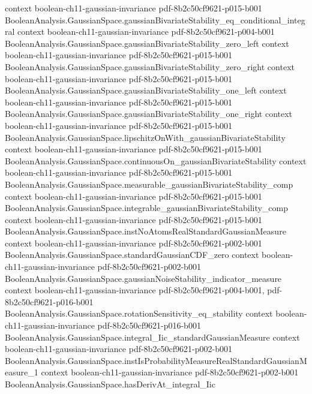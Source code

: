 \begin{theorem}
  {context}
  {boolean-ch11-gaussian-invariance}
  {pdf-8b2c50cf9621-p015-b001}
\proofstep
  {BooleanAnalysis.GaussianSpace.gaussianBivariateStability_eq_conditional_integral}
  {context}
  {boolean-ch11-gaussian-invariance}
  {pdf-8b2c50cf9621-p004-b001}
\proofstep
  {BooleanAnalysis.GaussianSpace.gaussianBivariateStability_zero_left}
  {context}
  {boolean-ch11-gaussian-invariance}
  {pdf-8b2c50cf9621-p015-b001}
\proofstep
  {BooleanAnalysis.GaussianSpace.gaussianBivariateStability_zero_right}
  {context}
  {boolean-ch11-gaussian-invariance}
  {pdf-8b2c50cf9621-p015-b001}
\proofstep
  {BooleanAnalysis.GaussianSpace.gaussianBivariateStability_one_left}
  {context}
  {boolean-ch11-gaussian-invariance}
  {pdf-8b2c50cf9621-p015-b001}
\proofstep
  {BooleanAnalysis.GaussianSpace.gaussianBivariateStability_one_right}
  {context}
  {boolean-ch11-gaussian-invariance}
  {pdf-8b2c50cf9621-p015-b001}
\proofstep
  {BooleanAnalysis.GaussianSpace.lipschitzOnWith_gaussianBivariateStability}
  {context}
  {boolean-ch11-gaussian-invariance}
  {pdf-8b2c50cf9621-p015-b001}
\proofstep
  {BooleanAnalysis.GaussianSpace.continuousOn_gaussianBivariateStability}
  {context}
  {boolean-ch11-gaussian-invariance}
  {pdf-8b2c50cf9621-p015-b001}
\proofstep
  {BooleanAnalysis.GaussianSpace.measurable_gaussianBivariateStability_comp}
  {context}
  {boolean-ch11-gaussian-invariance}
  {pdf-8b2c50cf9621-p015-b001}
\proofstep
  {BooleanAnalysis.GaussianSpace.integrable_gaussianBivariateStability_comp}
  {context}
  {boolean-ch11-gaussian-invariance}
  {pdf-8b2c50cf9621-p015-b001}
\proofstep
  {BooleanAnalysis.GaussianSpace.instNoAtomsRealStandardGaussianMeasure}
  {context}
  {boolean-ch11-gaussian-invariance}
  {pdf-8b2c50cf9621-p002-b001}
\proofstep
  {BooleanAnalysis.GaussianSpace.standardGaussianCDF_zero}
  {context}
  {boolean-ch11-gaussian-invariance}
  {pdf-8b2c50cf9621-p002-b001}
\proofstep
  {BooleanAnalysis.GaussianSpace.gaussianNoiseStability_indicator_measure}
  {context}
  {boolean-ch11-gaussian-invariance}
  {pdf-8b2c50cf9621-p004-b001,
    pdf-8b2c50cf9621-p016-b001}
\proofstep
  {BooleanAnalysis.GaussianSpace.rotationSensitivity_eq_stability}
  {context}
  {boolean-ch11-gaussian-invariance}
  {pdf-8b2c50cf9621-p016-b001}
\proofstep
  {BooleanAnalysis.GaussianSpace.integral_Iic_standardGaussianMeasure}
  {context}
  {boolean-ch11-gaussian-invariance}
  {pdf-8b2c50cf9621-p002-b001}
\proofstep
  {BooleanAnalysis.GaussianSpace.instIsProbabilityMeasureRealStandardGaussianMeasure_1}
  {context}
  {boolean-ch11-gaussian-invariance}
  {pdf-8b2c50cf9621-p002-b001}
\proofstep
  {BooleanAnalysis.GaussianSpace.hasDerivAt_integral_Iic}

\end{theorem}
